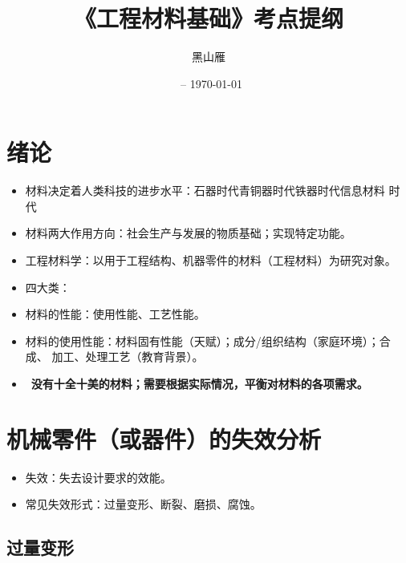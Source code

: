 \documentclass[12pt,a4paper]{article}
\title{《工程材料基础》考点提纲}
\date{\beginday\ -- \today}
\author{黑山雁}
\newcommand{\tightlist}{\setlength{\parskip}{0pt}\setlength{\itemsep}{0pt}}
\newcommand{\hint}[1]{\textsf{（#1）}}
\newcommand{\emphitem}[1]{\item[\faLightbulb]\ \textbf{#1}}
\begin{document}
\maketitle

\section{绪论}
\begin{itemize}\tightlist
    \item 材料决定着人类科技的进步水平：石器时代\to 青铜器时代\to 铁器时代\to 信息材料
    时代
    \item 材料两大作用方向：社会生产与发展的物质基础；实现特定功能。
    \item 工程材料学：以用于工程结构、机器零件的材料\hint{工程材料}为研究对象。
    \item 四大类：
    \item 材料的性能：使用性能、工艺性能。
    \item 材料的使用性能：材料固有性能\hint{天赋}；成分/组织结构\hint{家庭环境}；合成、
    加工、处理工艺\hint{教育背景}。
    \emphitem{没有十全十美的材料；需要根据实际情况，平衡对材料的各项需求。}
\end{itemize}

\section{机械零件（或器件）的失效分析}

\begin{itemize}\tightlist
    \item 失效：失去设计要求的效能。
    \item 常见失效形式：过量变形、断裂、磨损、腐蚀。
\end{itemize}

\subsection{过量变形}
\end{document}
